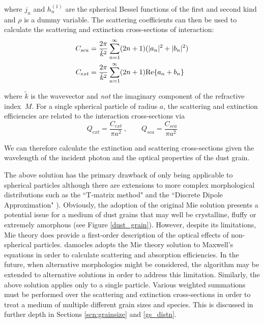 \noindent where $j_n$ and $h_n^{(1)}$ are the spherical Bessel functions of the first and second kind and $\rho$ is a dummy variable.  The scattering coefficients can then be used to calculate the scattering and extinction cross-sections of interaction:
\begin{align}
C_{sca}&=\frac{2\pi}{\tilde{k}^2}\sum_{n=1}^{\infty} (2n+1)(|a_n|^2+|b_n|^2) \\
C_{ext}&=\frac{2\pi}{\tilde{k}^2}\sum_{n=1}^{\infty} (2n+1)\textnormal{Re}\{a_n+b_n\} 
\end{align}

\noindent where $\tilde{k}$ is the wavevector and {\em not} the imaginary component of the refractive index $~M$.  For a single spherical particle of radius $a$, the scattering and extinction efficiencies are related to the interaction cross-sections via
\begin{equation}
Q_{ext}=\frac{C_{ext}}{\pi a^2}\, , \quad \quad Q_{sca}=\frac{C_{sca}}{\pi a^2}
\end{equation}

\noindent We can therefore calculate the extinction and scattering cross-sections given the wavelength of the incident photon and the optical properties of the dust grain.  



The above solution has the primary drawback of only being applicable to spherical particles although there are extensions to more complex morphological distributions such as the ``T-matrix method" and the ``Discrete Dipole Approximation" \citep{Mishchenko2002,Draine2004}). Obviously, the adoption of the original Mie solution presents a potential issue for a medium of dust grains that may well be crystalline, fluffy or extremely amorphous (see Figure \ref{dust_grain}).  However, despite its limitations, Mie theory does provide a first-order description of the optical effects of non-spherical particles.  {\sc damocles} adopts the Mie theory solution to Maxwell's equations in order to calculate scattering and absorption efficiencies.  In the future, when alternative morphologies might be considered, the algorithm may be extended to alternative solutions  in order to address this limitation.  Similarly, the above solution applies only to a single particle.  Various weighted summations must be performed over the scattering and extinction cross-sections in order to treat a medium of multiple different grain sizes and species.  This is discussed in further depth in Sections \ref{scn:grainsize} and \ref{gs_distn}.

